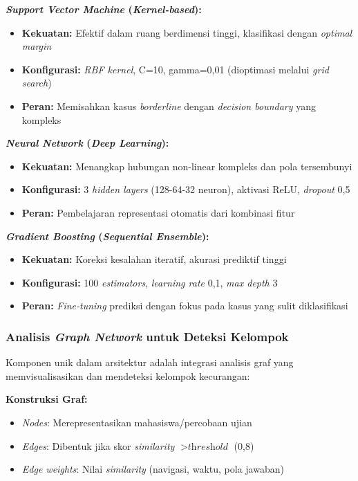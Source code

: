 \textbf{\textit{Support Vector Machine} (\textit{Kernel-based}):}
\begin{itemize}
    \item \textbf{Kekuatan:} Efektif dalam ruang berdimensi tinggi, klasifikasi dengan \textit{optimal margin}
    \item \textbf{Konfigurasi:} \textit{RBF kernel}, C=10, gamma=0,01 (dioptimasi melalui \textit{grid search})
    \item \textbf{Peran:} Memisahkan kasus \textit{borderline} dengan \textit{decision boundary} yang kompleks
\end{itemize}

\textbf{\textit{Neural Network} (\textit{Deep Learning}):}
\begin{itemize}
    \item \textbf{Kekuatan:} Menangkap hubungan non-linear kompleks dan pola tersembunyi
    \item \textbf{Konfigurasi:} 3 \textit{hidden layers} (128-64-32 neuron), aktivasi ReLU, \textit{dropout} 0,5
    \item \textbf{Peran:} Pembelajaran representasi otomatis dari kombinasi fitur
\end{itemize}

\textbf{\textit{Gradient Boosting} (\textit{Sequential Ensemble}):}
\begin{itemize}
    \item \textbf{Kekuatan:} Koreksi kesalahan iteratif, akurasi prediktif tinggi
    \item \textbf{Konfigurasi:} 100 \textit{estimators}, \textit{learning rate} 0,1, \textit{max depth} 3
    \item \textbf{Peran:} \textit{Fine-tuning} prediksi dengan fokus pada kasus yang sulit diklasifikasi
\end{itemize}

\subsubsection{Analisis \textit{Graph Network} untuk Deteksi Kelompok}
\label{sec:graphNetworkAnalysis}

Komponen unik dalam arsitektur adalah integrasi analisis graf yang memvisualisasikan dan mendeteksi kelompok kecurangan:

\textbf{Konstruksi Graf:}
\begin{itemize}
    \item \textit{Nodes}: Merepresentasikan mahasiswa/percobaan ujian
    \item \textit{Edges}: Dibentuk jika skor \textit{similarity} $> \textit{threshold}$ (0,8)
    \item \textit{Edge weights}: Nilai \textit{similarity} (navigasi, waktu, pola jawaban)
\end{itemize}

